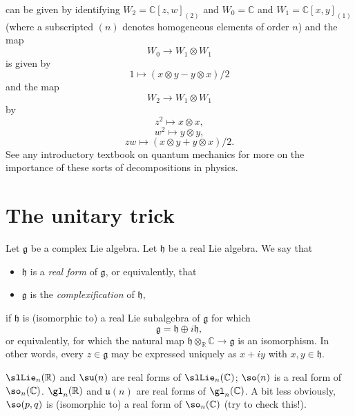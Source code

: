 \documentclass[reqno]{amsart} 
\begin{document}
can be given by identifying
$W_2 = \mathbb{C}[z,w]_{(2)}$
and $W_0 = \mathbb{C}$
and $W_1 = \mathbb{C}[x,y]_{(1)}$ (where a subscripted $(n)$
denotes homogeneous elements of order $n$)
and the map
\begin{equation*}
  W_0 \rightarrow W_1 \otimes W_1
\end{equation*}
is given by
\begin{equation*}
  1 \mapsto (x \otimes y - y \otimes x)/2
\end{equation*}
and the map
\begin{equation*}
  W_2 \rightarrow W_1 \otimes W_1
\end{equation*}
by
\begin{equation*}
  z^2 \mapsto x \otimes x,
\end{equation*}
\begin{equation*}
  w^2 \mapsto y \otimes y,
\end{equation*}
\begin{equation*}
  z w \mapsto (x \otimes y + y \otimes x)/2.
\end{equation*}
See any introductory textbook on quantum mechanics
for more on the importance of these sorts of decompositions in
physics.

\section{The unitary trick\label{sec:unitary-trick}}
\label{sec:orgb4bc044}
\begin{definition}
  Let $\mathfrak{g}$ be a complex Lie algebra.
  Let $\mathfrak{h}$ be a real Lie algebra.
  We say that
  \begin{itemize}
  \item   $\mathfrak{h}$ is a \emph{real form} of
    $\mathfrak{g}$, or equivalently, that
  \item $\mathfrak{g}$ is the \emph{complexification} of $\mathfrak{h}$,
  \end{itemize}
  if
  $\mathfrak{h}$ is (isomorphic to)
  a real Lie subalgebra
  of $\mathfrak{g}$
  for which
  \begin{equation*}
    \mathfrak{g} = \mathfrak{h} \oplus i \mathfrak{h},
  \end{equation*}
  or equivalently, for which the natural map
  $\mathfrak{h} \otimes_\mathbb{R} \mathbb{C} \rightarrow
  \mathfrak{g}$
  is an isomorphism.
  In other words, every $z \in \mathfrak{g}$
  may be expressed uniquely as $x + i y$
  with $x,y \in \mathfrak{h}$.
\end{definition}
\begin{example}
  $\slLie_n(\mathbb{R})$
  and
  $\su(n)$
  are real forms of
  $\slLie_n(\mathbb{C})$;
  $\so(n)$
  is a real form of
  $\so_n(\mathbb{C})$.
  $\gl_n(\mathbb{R})$
  and
  $\mathfrak{u}(n)$
  are real forms of
  $\gl_n(\mathbb{C})$.
  A bit less obviously,
  $\so(p,q)$
  is (isomorphic to) a real form of
  $\so_n(\mathbb{C})$
  (try to check this!).
\end{example}
\end{document}

